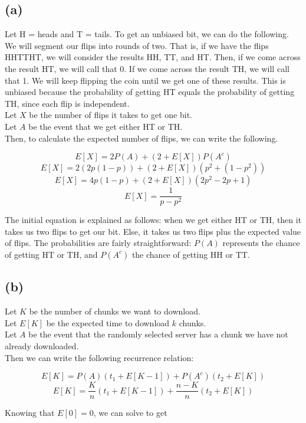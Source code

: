 \documentclass{article}
\begin{document}
\subsection*{(a)}
Let H = heads and T = tails.
To get an unbiased bit, we can do the following. We will segment our flips into
rounds of two. That is, if we have the flips HHTTHT, we will consider the results
HH, TT, and HT. Then, if we come across the result HT, we will call that 0. If we
come across the result TH, we will call that 1. We will keep flipping the coin
until we get one of these results. This is unbiased because the probability of
getting HT equals the probability of getting TH, since each flip is independent. \\

\noindent Let $X$ be the number of flips it takes to get one bit. \\
Let $A$ be the event that we get either HT or TH. \\

\noindent Then, to calculate the expected number of flips, we can write the following.

\[ E[X] = 2 P(A) + (2 + E[X]) P(A^c) \]
\[ E[X] = 2 (2p(1 - p)) + (2 + E[X]) (p^2 + (1 - p^2)) \]
\[ E[X] = 4p(1 - p) + (2 + E[X]) (2p^2 - 2p + 1) \]
\[ E[X] = \frac{1}{p - p^2} \]

\noindent The initial equation is explained as follows: when we get either HT or TH, 
then it takes us two flips to get our bit. Else, it takes us two flips plus the 
expected value of flips. The probabilities are fairly straightforward: $P(A)$ 
represents the chance of getting HT or TH, and $P(A^c)$ the chance of getting HH
or TT.

\subsection*{(b)}
Let $K$ be the number of chunks we want to download.  \\
Let $E[K]$ be the expected time to download $k$ chunks. \\
Let $A$ be the event that the randomly selected server has a chunk we have not already
downloaded. \\

\noindent Then we can write the following recurrence relation:

\[ E[K] = P(A)(t_1 + E[K - 1]) + P(A^c)(t_2 + E[K]) \]
\[ E[K] = \frac{K}{n} (t_1 + E[K - 1]) + \frac{n - K}{n} (t_2 + E[K]) \]

\noindent Knowing that $E[0] = 0$, we can solve to get 
\end{document}
